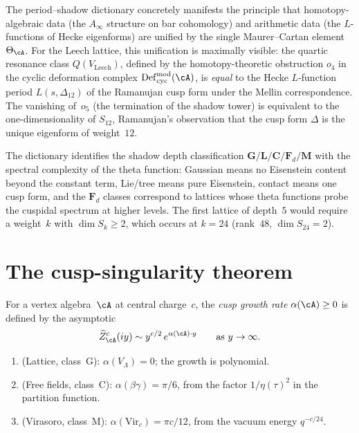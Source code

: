 \begin{remark}
\label{rem:homotopy-becomes-arithmetic}
%
The period--shadow dictionary concretely manifests
the principle that homotopy-algebraic data (the $A_\infty$
structure on bar cohomology) and arithmetic data (the $L$-functions
of Hecke eigenforms) are unified by the single Maurer--Cartan
element $\Theta_\cA$. For the Leech lattice, this unification
is maximally visible: the quartic resonance class
$Q(V_{\mathrm{Leech}})$, defined by the homotopy-theoretic
obstruction $o_4$ in the cyclic deformation complex
$\mathrm{Def}_{\mathrm{cyc}}^{\mathrm{mod}}(\cA)$, is
\emph{equal} to the Hecke $L$-function period $L(s,\Delta_{12})$
of the Ramanujan cusp form under the Mellin correspondence.
The vanishing of~$o_5$ (the termination of the shadow
tower) is equivalent to the one-dimensionality of $S_{12}$,
Ramanujan's observation that the cusp form $\Delta$ is the unique
eigenform of weight~$12$.

The dictionary identifies the shadow depth
classification
$\mathbf{G}/\mathbf{L}/\mathbf{C}/\mathbf{F}_d/\mathbf{M}$
with the spectral complexity of the theta function: Gaussian
means no Eisenstein content beyond the constant term, Lie/tree
means pure Eisenstein, contact means one cusp form, and the
$\mathbf{F}_d$ classes correspond to lattices whose theta
functions probe the cuspidal spectrum at higher levels.
The first lattice of depth~$5$ would require a weight~$k$
with $\dim S_k \ge 2$, which occurs at $k=24$
(rank~$48$, $\dim S_{24} = 2$).
\end{remark}

\section{The cusp-singularity theorem}
\label{sec:cusp-singularity}

\begin{definition}
\label{def:cusp-growth-rate}
For a vertex algebra~$\cA$ at central charge~$c$, the
\emph{cusp growth rate} $\alpha(\cA)\ge0$ is defined by the asymptotic
\[
 \widehat{Z}^c_\cA(iy)
 \sim y^{c/2}\,e^{\alpha(\cA)\cdot y}
 \qquad\text{as } y\to\infty.
\]
\end{definition}

\begin{proposition}
\label{prop:growth-rate-dictionary}
\ClaimStatusProvedHere
\mbox{}
\begin{enumerate}[label=\textup{(\roman*)}]
\item \textup{(Lattice, class~G):}
 $\alpha(V_\Lambda)=0$; the growth is polynomial.
\item \textup{(Free fields, class~C):}
 $\alpha(\beta\gamma)=\pi/6$, from the
 factor $1/\eta(\tau)^2$ in the partition function.
\item \textup{(Virasoro, class~M):}
 $\alpha(\mathrm{Vir}_c)=\pi c/12$, from the vacuum energy
 $q^{-c/24}$.
\end{enumerate}
\end{proposition}

